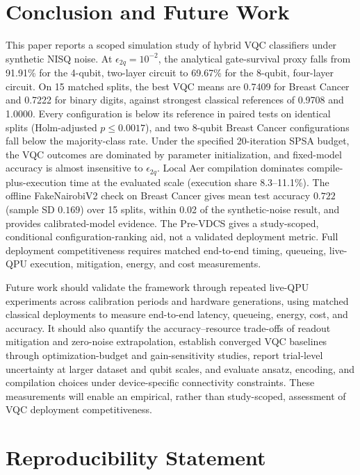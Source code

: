 \documentclass[final,5p,times,number]{elsarticle}
\begin{document}
\section{Conclusion and Future Work}
\label{sec:conclusion}

This paper reports a scoped simulation study of hybrid VQC classifiers under synthetic NISQ noise. At $\epsilon_{2q}=10^{-2}$, the analytical gate-survival proxy falls from 91.91\% for the 4-qubit, two-layer circuit to 69.67\% for the 8-qubit, four-layer circuit. On 15 matched splits, the best VQC means are 0.7409 for Breast Cancer and 0.7222 for binary digits, against strongest classical references of 0.9708 and 1.0000. Every configuration is below its reference in paired tests on identical splits (Holm-adjusted $p\le0.0017$), and two 8-qubit Breast Cancer configurations fall below the majority-class rate. Under the specified 20-iteration SPSA budget, the VQC outcomes are dominated by parameter initialization, and fixed-model accuracy is almost insensitive to $\epsilon_{2q}$. Local Aer compilation dominates compile-plus-execution time at the evaluated scale (execution share 8.3--11.1\%). The offline FakeNairobiV2 check on Breast Cancer gives mean test accuracy $0.722$ (sample SD $0.169$) over 15 splits, within 0.02 of the synthetic-noise result, and provides calibrated-model evidence. The Pre-VDCS gives a study-scoped, conditional configuration-ranking aid, not a validated deployment metric. Full deployment competitiveness requires matched end-to-end timing, queueing, live-QPU execution, mitigation, energy, and cost measurements.

Future work should validate the framework through repeated live-QPU experiments across calibration periods and hardware generations, using matched classical deployments to measure end-to-end latency, queueing, energy, cost, and accuracy. It should also quantify the accuracy--resource trade-offs of readout mitigation and zero-noise extrapolation, establish converged VQC baselines through optimization-budget and gain-sensitivity studies, report trial-level uncertainty at larger dataset and qubit scales, and evaluate ansatz, encoding, and compilation choices under device-specific connectivity constraints. These measurements will enable an empirical, rather than study-scoped, assessment of VQC deployment competitiveness.

\section*{Reproducibility Statement}
\label{sec:repro}
\end{document}
